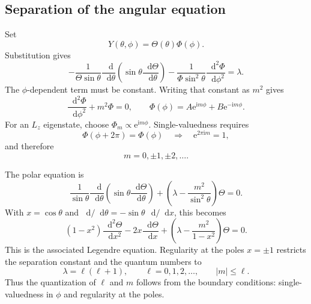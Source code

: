 \documentclass[11pt]{article}
\newcommand{\dd}{\mathop{}\!\mathrm{d}}
\newcommand{\ee}{\mathrm{e}}
\newcommand{\ii}{\mathrm{i}}
\newcommand{\abs}[1]{\left\lvert #1\right\rvert}
\begin{document}
\subsection{Separation of the angular equation}

Set
\begin{equation}
  Y(\theta,\phi)=\Theta(\theta)\Phi(\phi).
\end{equation}
Substitution gives
\begin{equation}
  -\frac{1}{\Theta\sin\theta}
  \frac{\dd}{\dd\theta}\left(\sin\theta\frac{\dd\Theta}{\dd\theta}\right)
  -\frac{1}{\Phi\sin^2\theta}\frac{\dd^2\Phi}{\dd\phi^2}
  =\lambda.
\end{equation}
The $\phi$-dependent term must be constant.  Writing that constant as $m^2$ gives
\begin{equation}
  \frac{\dd^2\Phi}{\dd\phi^2}+m^2\Phi=0,
  \qquad
  \Phi(\phi)=A\ee^{\ii m\phi}+B\ee^{-\ii m\phi}.
\end{equation}
For an $L_z$ eigenstate, choose $\Phi_m\propto\ee^{\ii m\phi}$.  Single-valuedness
requires
\begin{equation}
  \Phi(\phi+2\pi)=\Phi(\phi)
  \quad\Longrightarrow\quad
  \ee^{2\pi\ii m}=1,
\end{equation}
and therefore
\begin{equation}
  \boxed{m=0,\pm1,\pm2,\ldots}.
\end{equation}

The polar equation is
\begin{equation}
  \frac{1}{\sin\theta}\frac{\dd}{\dd\theta}
  \left(\sin\theta\frac{\dd\Theta}{\dd\theta}\right)
  +\left(\lambda-\frac{m^2}{\sin^2\theta}\right)\Theta=0.
\end{equation}
With $x=\cos\theta$ and
$\dd/\dd\theta=-\sin\theta\,\dd/\dd x$, this becomes
\begin{equation}
  \boxed{
  (1-x^2)\frac{\dd^2\Theta}{\dd x^2}
  -2x\frac{\dd\Theta}{\dd x}
  +\left(\lambda-\frac{m^2}{1-x^2}\right)\Theta=0
  }.
  \label{eq:associated-legendre}
\end{equation}
This is the associated Legendre equation.  Regularity at the poles $x=\pm1$
restricts the separation constant and the quantum numbers to
\begin{equation}
  \boxed{\lambda=\ell(\ell+1)},
  \qquad
  \ell=0,1,2,\ldots,
  \qquad
  \boxed{\abs{m}\leq\ell}.
\end{equation}
Thus the quantization of $\ell$ and $m$ follows from the boundary conditions:
single-valuedness in $\phi$ and regularity at the poles.
\end{document}
